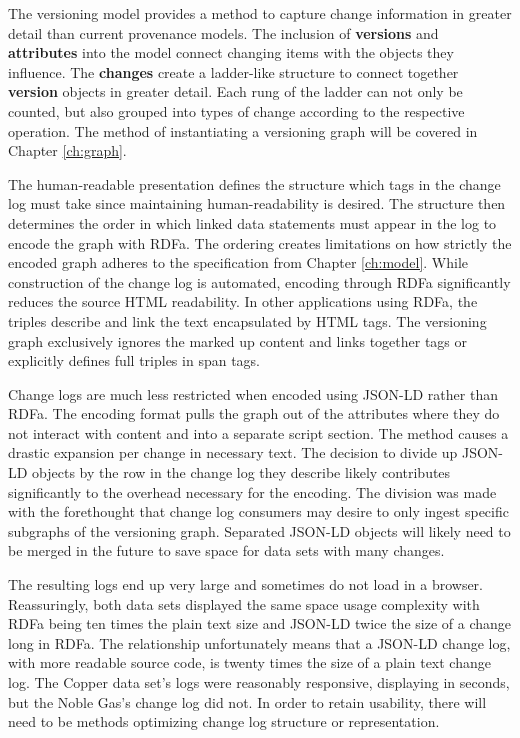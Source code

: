 The versioning model provides a method to capture change information in greater detail than current provenance models.
The inclusion of \textbf{versions} and \textbf{attributes} into the model connect changing items with the objects they influence.
The \textbf{changes} create a ladder-like structure to connect together \textbf{version} objects in greater detail.
Each rung of the ladder can not only be counted, but also grouped into types of change according to the respective operation.
The method of instantiating a versioning graph will be covered in Chapter \ref{ch:graph}.

The human-readable presentation defines the structure which tags in the chan\-ge log must take since maintaining human-readability is desired.
The structure then determines the order in which linked data statements must appear in the log to encode the graph with RDFa.
The ordering creates limitations on how strictly the encoded graph adheres to the specification from Chapter \ref{ch:model}.
While construction of the change log is automated, encoding through RDFa significantly reduces the source HTML readability.
In other applications using RDFa, the triples describe and link the text encapsulated by HTML tags.
The versioning graph exclusively ignores the marked up content and links together tags or explicitly defines full triples in span tags.

Change logs are much less restricted when encoded using JSON-LD rather than RDFa.
The encoding format pulls the graph out of the attributes where they do not interact with content and into a separate script section.
The method causes a drastic expansion per change in necessary text.
The decision to divide up JSON-LD objects by the row in the change log they describe likely contributes significantly to the overhead necessary for the encoding.
The division was made with the forethought that change log consumers may desire to only ingest specific subgraphs of the versioning graph.
Separated JSON-LD objects will likely need to be merged in the future to save space for data sets with many changes.

The resulting logs end up very large and sometimes do not load in a browser.
Reassuringly, both data sets displayed the same space usage complexity with RDFa being ten times the plain text size and JSON-LD twice the size of a change long in RDFa.
The relationship unfortunately means that a JSON-LD change log, with more readable source code, is twenty times the size of a plain text change log.
The Copper data set's logs were reasonably responsive, displaying in seconds, but the Noble Gas's change log did not.
In order to retain usability, there will need to be methods optimizing change log structure or representation.